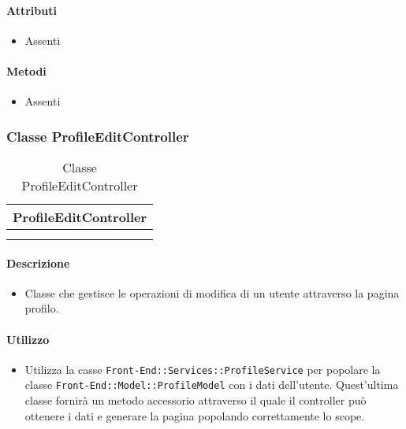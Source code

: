 \paragraph*{Attributi}
\begin{itemize}
\item[] Assenti
\end{itemize}

\paragraph*{Metodi}
\begin{itemize}
\item[] Assenti
\end{itemize}

\subsubsection{Classe ProfileEditController}

\begin{table}[ht]
\begin{center}
\bgroup
\setlength{\arrayrulewidth}{0.6mm}
\def\arraystretch{1}
\begin{tabular}{ | p{12cm} | }
\hline
\centerline{\textbf{ProfileEditController}}
\\ \hline
 \\ 
\hline
 \\ 
\hline
\end{tabular}
\egroup
\caption{Classe ProfileEditController}
\end{center}
\end{table}

\paragraph*{Descrizione}
\begin{itemize}
\item[] Classe che gestisce le operazioni di modifica di un utente attraverso la pagina profilo.
\end{itemize}

\paragraph*{Utilizzo}
\begin{itemize}
\item[] Utilizza la casse \texttt{Front-End::Services::ProfileService} per popolare la classe \texttt{Front-End::Model::ProfileModel} con i dati dell'utente. Quest'ultima classe fornirà un metodo accessorio attraverso il quale il controller può ottenere i dati e generare la pagina popolando correttamente lo scope.
\end{itemize}

